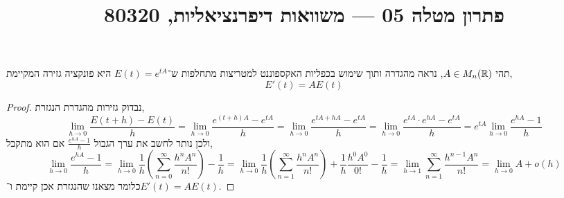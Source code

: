 
\title{פתרון מטלה 05 --- משוואות דיפרנציאליות, 80320}


\maketitle
\maketitleprint[blue]{}

\question{}
תהי $A \in M_n(\mathbb{R})$,
נראה מהגדרה ותוך שימוש בכפליות האקספוננט למטריצות מתחלפות ש־$E(t) = e^{tA}$ היא פונקציה גזירה המקיימת,
\[
	E'(t)
	= A E(t)
\]
\begin{proof}
	נבדוק גזירות מהגדרת הנגזרת,
	\[
		\lim_{h \to 0} \frac{E(t + h) - E(t)}{h}
		= \lim_{h \to 0} \frac{e^{(t + h)A} - e^{tA}}{h}
		= \lim_{h \to 0} \frac{e^{tA + hA} - e^{tA}}{h}
		= \lim_{h \to 0} \frac{e^{tA} \cdot e^{hA} - e^{tA}}{h}
		= e^{tA} \lim_{h \to 0} \frac{e^{hA} - 1}{h}
	\]
	ולכן נותר לחשב את ערך הגבול $\frac{e^{hA} - 1}{h}$ אם הוא מתקבל,
	\[
		\lim_{h \to 0} \frac{e^{hA} - 1}{h}
		= \lim_{h \to 0} \frac{1}{h} \left(\sum_{n = 0}^\infty \frac{h^n A^n}{n!}\right) - \frac{1}{h}
		= \lim_{h \to 0} \frac{1}{h} \left(\sum_{n = 1}^\infty \frac{h^n A^n}{n!}\right) + \frac{1}{h} \frac{h^0 A^0}{0!} - \frac{1}{h}
		= \lim_{h \to 1} \sum_{n = 1}^\infty \frac{h^{n - 1} A^n}{n!}
		= \lim_{h \to 0} A + o(h)
	\]
	כלומר מצאנו שהנגזרת אכן קיימת ו־$E'(t) = A E(t)$.
\end{proof}

